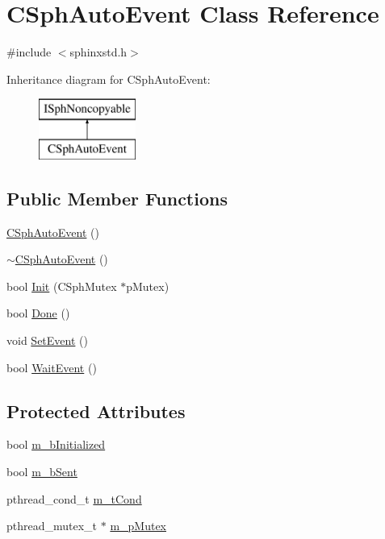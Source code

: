 \hypertarget{classCSphAutoEvent}{\section{C\-Sph\-Auto\-Event Class Reference}
\label{classCSphAutoEvent}
}


{\ttfamily \#include $<$sphinxstd.\-h$>$}

Inheritance diagram for C\-Sph\-Auto\-Event\-:\begin{figure}[H]
\begin{center}
\leavevmode
\includegraphics[height=2.000000cm]{classCSphAutoEvent}
\end{center}
\end{figure}
\subsection*{Public Member Functions}
\begin{DoxyCompactItemize}
\item 
\hyperlink{classCSphAutoEvent_aa0ac0df23395895a82d919ef3267991f}{C\-Sph\-Auto\-Event} ()
\item 
\hyperlink{classCSphAutoEvent_a6faa08f6461599e8524d2cebe57459c1}{$\sim$\-C\-Sph\-Auto\-Event} ()
\item 
bool \hyperlink{classCSphAutoEvent_ae469653196d282cbe3adcf31a9a8e490}{Init} (C\-Sph\-Mutex $\ast$p\-Mutex)
\item 
bool \hyperlink{classCSphAutoEvent_a702194799ef1d17be24f4ac5a2e88eb8}{Done} ()
\item 
void \hyperlink{classCSphAutoEvent_ae1e2b47aa6df3498bc605fcebedac8d9}{Set\-Event} ()
\item 
bool \hyperlink{classCSphAutoEvent_a95d12203276238859d18c6dc3b5e55e4}{Wait\-Event} ()
\end{DoxyCompactItemize}
\subsection*{Protected Attributes}
\begin{DoxyCompactItemize}
\item 
bool \hyperlink{classCSphAutoEvent_a4fcafeb9de9298f736d43f9453527454}{m\-\_\-b\-Initialized}
\item 
bool \hyperlink{classCSphAutoEvent_a2d58681011e343892baba94e7693a60c}{m\-\_\-b\-Sent}
\item 
pthread\-\_\-cond\-\_\-t \hyperlink{classCSphAutoEvent_a24395747674c91fc8e840c49feb8bfa6}{m\-\_\-t\-Cond}
\item 
pthread\-\_\-mutex\-\_\-t $\ast$ \hyperlink{classCSphAutoEvent_a9860d49c0d3c508561cf7874a4e2f8a7}{m\-\_\-p\-Mutex}
\end{DoxyCompactItemize}


